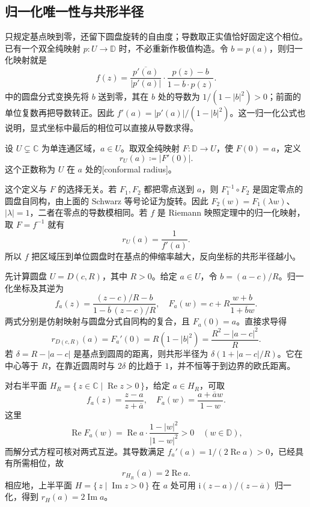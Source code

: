 \subsection{归一化唯一性与共形半径}
\label{b3:subsec:050302}

只规定基点映到零，还留下圆盘旋转的自由度；导数取正实值恰好固定这个相位。已有一个双全纯映射 \(p:U\rightarrow\mathbb D\) 时，不必重新作极值构造。令 \(b=p(a)\)，则归一化映射就是
\[
 f(z)=\frac{\overline{p'(a)}}{|p'(a)|}
 \cdot\frac{p(z)-b}{1-\overline b\cdot p(z)}.
\]
中的圆盘分式变换先将 \(b\) 送到零，其在 \(b\) 处的导数为 \(1/(1-|b|^2)>0\)；前面的单位复数再把导数转正。因此 \(f'(a)=|p'(a)|/(1-|b|^2)\)。这一归一化公式也说明，显式坐标中最后的相位可以直接从导数求得。

\begin{definition}\label{b3:def:05-conformal-radius}
设 \(U\subsetneq\mathbb C\) 为单连通区域，\(a\in U\)。取双全纯映射 \(F:\mathbb D\rightarrow U\)，使 \(F(0)=a\)，定义
\[
 r_U(a)\coloneqq |F'(0)|.
\]
这个正数称为 \(U\) 在 \(a\) 处的[conformal radius]。
\end{definition}

这个定义与 \(F\) 的选择无关。若 \(F_1,F_2\) 都把零点送到 \(a\)，则 \(F_1^{-1}\circ F_2\) 是固定零点的圆盘自同构，由上面的 Schwarz 等号论证为旋转。因此 \(F_2(w)=F_1(\lambda w)\)、\(|\lambda|=1\)，二者在零点的导数模相同。若 \(f\) 是 Riemann 映照定理中的归一化映射，取 \(F=f^{-1}\) 就有
\[
 r_U(a)=\frac1{f'(a)}.
\]
所以 \(f\) 把区域压到单位圆盘时在基点的伸缩率越大，反向坐标的共形半径越小。

\ProseParagraphBreak

先计算圆盘 \(U=D(c,R)\)，其中 \(R>0\)。给定 \(a\in U\)，令 \(b=(a-c)/R\)。归一化坐标及其逆为
\[
 f_a(z)=\frac{(z-c)/R-b}{1-\overline b\,(z-c)/R},
 \quad F_a(w)=c+R\frac{w+b}{1+\overline b w}.
\]
两式分别是仿射映射与圆盘分式自同构的复合，且 \(F_a(0)=a\)。直接求导得
\[
 r_{D(c,R)}(a)=F_a'(0)
 =R(1-|b|^2)=\frac{R^2-|a-c|^2}{R}.
\]
若 \(\delta=R-|a-c|\) 是基点到圆周的距离，则共形半径为 \(\delta(1+|a-c|/R)\)。它在中心等于 \(R\)，在靠近圆周时与 \(2\delta\) 的比趋于 \(1\)，并不恒等于到边界的欧氏距离。

\ProseParagraphBreak

对右半平面 \(H_R=\{\,z\in\mathbb C\mid\operatorname{Re}z>0\,\}\)，给定 \(a\in H_R\)，可取
\[
 f_a(z)=\frac{z-a}{z+\overline a},
 \quad F_a(w)=\frac{a+\overline a w}{1-w}.
\]
这里
\[
 \operatorname{Re}F_a(w)
 =\operatorname{Re}a\cdot\frac{1-|w|^2}{|1-w|^2}>0
 \quad(w\in\mathbb D),
\]
而解分式方程可核对两式互逆。其导数满足 \(f_a'(a)=1/(2\operatorname{Re}a)>0\)，已经具有所需相位，故
\[
 r_{H_R}(a)=2\operatorname{Re}a.
\]
相应地，上半平面 \(H=\{\,z\mid\operatorname{Im}z>0\,\}\) 在 \(a\) 处可用 \(\mathrm{i}(z-a)/(z-\overline a)\) 归一化，得到 \(r_H(a)=2\operatorname{Im}a\)。

